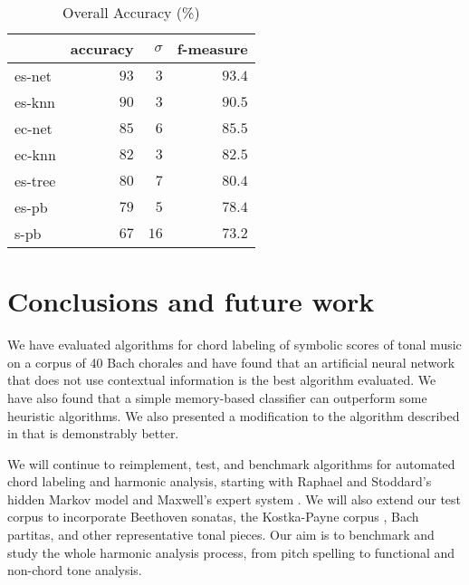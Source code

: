 \documentclass{article}
\begin{document}
\begin{table}
  \centering
  \begin{tabular}{l|rrr}
       & accuracy& $\sigma$  & f-measure\\
\hline
es-net &$   93  $&$  3$      &$93.4$ \\
es-knn &$   90  $&$  3$      &$90.5$ \\
ec-net &$   85  $&$  6$      &$85.5$ \\
ec-knn &$   82  $&$  3$      &$82.5$ \\
es-tree&$   80  $&$  7$      &$80.4$ \\
es-pb  &$   79  $&$  5$      &$78.4$ \\
s-pb   &$   67  $&$ 16$      &$73.2$ \\

  \end{tabular}                                                        


  \caption{Overall Accuracy (\%)}
  \label{tab:accuracy}
\end{table}

\section{Conclusions and future work}
\label{sec:conclusions}

We have evaluated algorithms for chord labeling of symbolic scores of
tonal music on a corpus of 40 Bach chorales and have found that an
artificial neural network that does not use contextual information is
the best algorithm evaluated. We have also found that a simple
memory-based classifier can outperform some heuristic algorithms. We
also presented a modification to the algorithm described in
\cite{pardo.ea:algorithms} that is demonstrably better.

We will continue to reimplement, test, and benchmark algorithms for
automated chord labeling and harmonic analysis, starting with Raphael
and Stoddard's hidden Markov model \cite{raphael.ea:harmonic} and
Maxwell's expert system \cite{maxwell:expert}.  We will also extend
our test corpus to incorporate Beethoven sonatas, the Kostka-Payne
corpus \cite{temperley:bayesian}, Bach partitas, and other
representative tonal pieces. Our aim is to benchmark and study the
whole harmonic analysis process, from pitch spelling to functional and
non-chord tone analysis.



\end{document}
